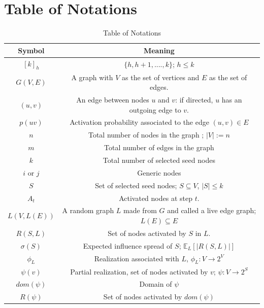 \pagebreak

\section{Table of Notations} \label{sec:not}

    \begin{table} [ht]
    \centering
    \caption{Table of Notations}
    \begin{adjustbox}{width=1\textwidth}
    \begin{tabular}{ | c | c | }
    \hline
    \textbf{Symbol}& \textbf{Meaning} \\ [1ex]
     \hline
     \hline
    $[k]_h$&  $\{h, h+1,....,k\}$; $h \leq k$\\ [1ex] \hline
    $G(V,E)$& A graph with $V$ as the set of vertices and $E$ as the set of edges.  \\[1ex]  \hline
    $(u,v)$& An edge between nodes $u$ and $v$: if directed, $u$ has an outgoing edge to $v$.  \\[1ex]  \hline
    $p(uv)$ & Activation probability associated to the edge $(u,v) \in E$  \\[1ex]  \hline
    $n$& Total number of nodes in the graph ; $|V|:=n$\\ [1ex]  \hline
    $m$& Total number of edges in the graph \\ [1ex]  \hline
    $k$& Total number of selected seed nodes\\[1ex] \hline
    $i$ or $j$& Generic nodes\\[1ex] \hline
    $S$& Set of selected seed nodes; $S \subseteq V$, $|S| \leq k$ \\[1ex] \hline
    $A_t$& Activated nodes at step $t$. \\[1ex] \hline
    $L(V,L(E))$& A random graph $L$ made from $G$ and called a live edge graph; $L(E) \subseteq E$\\[1ex] \hline
    $R(S,L)$& Set of nodes activated by $S$ in $L$.\\[1ex] \hline
    $\sigma(S)$& Expected influence spread of $S$; $\mathbb{E}_L[|R(S,L)|]$\\[1ex] \hline
    $\phi_L$& Realization associated with $L$, $\phi_L : V \rightarrow 2^V$\\[1ex] \hline
    $\psi(v)$& Partial realization, set of nodes activated by $v$; $\psi : V \rightarrow 2^S$\\[1ex] \hline
    $dom(\psi)$& Domain of $\psi$\\[1ex] \hline
    $R(\psi)$& Set of nodes activated by $dom(\psi)$\\[1ex] \hline

\end{tabular}
\end{adjustbox}
\end{table}

